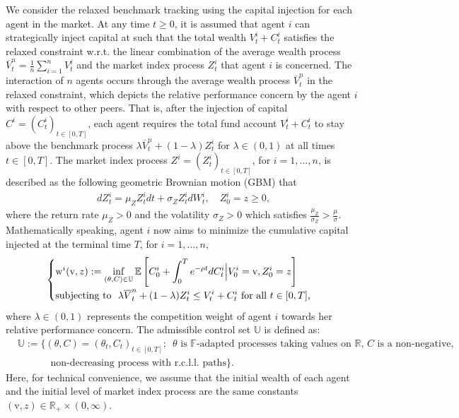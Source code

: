 \documentclass[11pt,times,letter]{article}
\newcommand{\Ex}{ \mathbb{E} }
\newcommand{\Fx}{\mathbb{F} }
\newcommand{\R}{\mathds{R}}
\numberwithin{equation}{section}
\begin{document}
We consider the relaxed benchmark tracking using the capital injection for each agent in the market.  At any time $t\geq0$, it is
 assumed that agent $i$ can strategically inject capital at such that the total wealth $V_t^i+C_t^i$
satisfies the relaxed constraint w.r.t. the linear combination of the average wealth process $\overline{V}_t^n=\frac{1}{n}\sum_{i=1}^n V^i_t$  and the market index process $Z_t^i$ that agent $i$ is concerned. The interaction of $n$ agents occurs through the average wealth process $\overline{V}^n_t$ in the relaxed constraint, which depicts the relative performance concern by the agent $i$ with respect to other peers. That is, after the injection of capital $C^i=(C_t^i)_{t\in[0,T]}$, each agent requires the total fund account $V_t^i+C_t^i$ to stay above the benchmark process $\lambda \overline{V}_t^n+(1-\lambda)Z_t^i$ for $\lambda \in(0,1)$ at all times $t\in[0,T]$. The market index process  $Z^i=(Z_t^i)_{t \in [0,T]}$, for $i=1,...,n$, is described as the following geometric Brownian motion (GBM) that
\begin{align}\label{eq:Zt-n}
d Z_t^i=\mu_Z Z_t^i d t+\sigma_Z Z_t^i d W_t^{i}, \quad Z_0^i=z\geq0,
\end{align}
where the return rate $\mu_Z>0$ and the volatility $\sigma_Z>0$ which satisfies $\frac{\mu_Z}{\sigma_Z}>\frac{\mu}{\sigma}$. Mathematically speaking, agent $i$ now aims to minimize the cumulative capital injected at the terminal time $T$, for $i=1,\ldots,n$, 
\begin{align}\label{eq:n-player}
\begin{cases}
\displaystyle {\rm w}^i(\mathrm{v},z):=\text{$\inf_{(\theta, C)\in\mathbb{U}} \Ex\left[ C_0^i+\int_0^{T} e^{-\rho t}dC^i_t\Big|V^i_0=\mathrm{v},Z_0^i=z\right]$}\\[1em]
\displaystyle \text{subjecting to\ \  $\lambda \overline{V}_t^n+(1-\lambda)Z_t^i\le V^i_t+C^i_t$ for all $t\in [0,T]$,}
\end{cases}
\end{align}
where $\lambda \in(0,1)$  represents the competition weight of agent $i$ towards her relative performance concern. The admissible control set $\mathbb{U}$ is defined as:
\begin{align*}
&\mathbb{U}:=\big\{\text{$(\theta,C)=(\theta_t,C_t)_{t\in[0,T]}$;~ $\theta$ is $\Fx$-adapted processes taking values on $\R$, $C$ is a non-negative,}\\
&\qquad\quad\text{ non-decreasing process with r.c.l.l. paths}\big\}.
\end{align*}
Here, for technical convenience, we assume that the initial wealth of each agent and the initial level of market index process are the same constants $(\mathrm{v},z)\in \R_+\times (0,\infty)$. 
 
\end{document}
